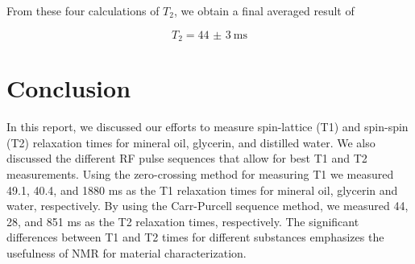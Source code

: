 \documentclass[
    floatfix,  %
    reprint,
    amsmath,
    amssymb,
    aps,
]{revtex4-2}
\begin{document}
From these four calculations of $T_2$, we obtain a final averaged result of

\begin{equation}
    T_2 = \SI[uncertainty-mode=separate]{44(3)}{\milli\second}
\end{equation}







\section{Conclusion}

In this report, we discussed our efforts to
measure spin-lattice (T1) and spin-spin (T2) relaxation
times for mineral oil, glycerin, and distilled water. We also discussed the different RF
pulse sequences that allow for best T1 and T2 measurements. Using the zero-crossing method for measuring T1 we measured 49.1, 40.4, and 1880 ms as the T1 relaxation times for mineral oil, glycerin and water, respectively. By using the Carr-Purcell sequence method, we measured 44, 28, and 851 ms as the T2 relaxation times, respectively. The significant differences between T1 and T2 times for different substances emphasizes the usefulness of NMR for material characterization. 



























\nocite{*}
\end{document}
